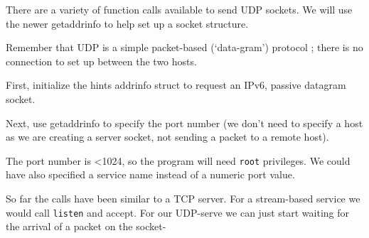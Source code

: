 There are a variety of function calls available to send UDP sockets. We
will use the newer getaddrinfo to help set up a socket structure.

Remember that UDP is a simple packet-based (`data-gram') protocol ;
there is no connection to set up between the two hosts.

First, initialize the hints addrinfo struct to request an IPv6, passive
datagram socket.

\begin{Shaded}
\begin{Highlighting}[]
\NormalTok{, }
\end{Highlighting}
\end{Shaded}

Next, use getaddrinfo to specify the port number (we don't need to
specify a host as we are creating a server socket, not sending a packet
to a remote host).

\begin{Shaded}
\begin{Highlighting}[]

\end{Highlighting}
\end{Shaded}

The port number is \textless{}1024, so the program will need
\texttt{root} privileges. We could have also specified a service name
instead of a numeric port value.

So far the calls have been similar to a TCP server. For a stream-based
service we would call \texttt{listen} and accept. For our UDP-serve we
can just start waiting for the arrival of a packet on the socket-

\begin{Shaded}
\begin{Highlighting}[]
 
 


\end{Highlighting}
\end{Shaded}

